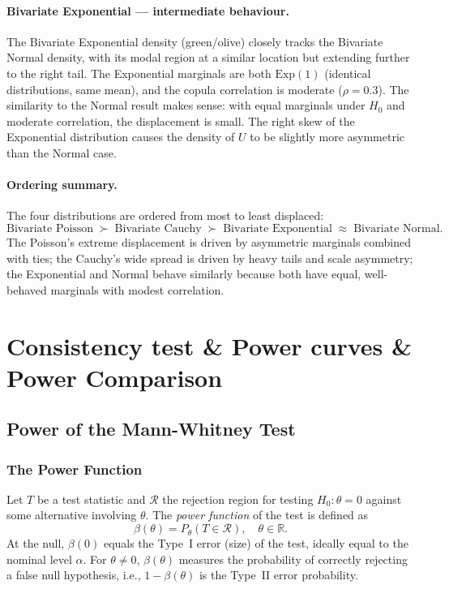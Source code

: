 \documentclass[10pt]{article}
\begin{document}
\paragraph{Bivariate Exponential --- intermediate behaviour.}
The Bivariate Exponential density (green/olive) closely tracks
the Bivariate Normal density, with its modal region at a similar
location but extending further to the right tail.  The Exponential
marginals are both $\text{Exp}(1)$ (identical distributions, same
mean), and the copula correlation is moderate ($\rho = 0.3$).
The similarity to the Normal result makes sense: with equal
marginals under $H_0$ and moderate correlation, the displacement
is small.  The right skew of the Exponential distribution causes
the density of $U$ to be slightly more asymmetric than the Normal
case.

\paragraph{Ordering summary.}
The four distributions are ordered from most to least displaced:
\[
  \text{Bivariate Poisson}
  \;\succ\; \text{Bivariate Cauchy}
  \;\succ\; \text{Bivariate Exponential}
  \;\approx\; \text{Bivariate Normal}.
\]
The Poisson's extreme displacement is driven by asymmetric
marginals combined with ties; the Cauchy's wide spread is driven by
heavy tails and scale asymmetry; the Exponential and Normal behave
similarly because both have equal, well-behaved marginals with
modest correlation.

\section{Consistency test \& Power curves \& Power Comparison}
\subsection{Power of the Mann-Whitney Test}
\subsubsection{The Power Function}
 
Let $T$ be a test statistic and $\mathcal{R}$ the rejection region for testing
$H_0: \theta = 0$ against some alternative involving $\theta$. The \textit{power
function} of the test is defined as
\[
    \beta(\theta) = P_\theta\!\left(T \in \mathcal{R}\right), \quad \theta \in \mathbb{R}.
\]
At the null, $\beta(0)$ equals the Type~I error (size) of the test, ideally
equal to the nominal level $\alpha$. For $\theta \neq 0$, $\beta(\theta)$
measures the probability of correctly rejecting a false null hypothesis, i.e.,
$1 - \beta(\theta)$ is the Type~II error probability.
 
\end{document}
